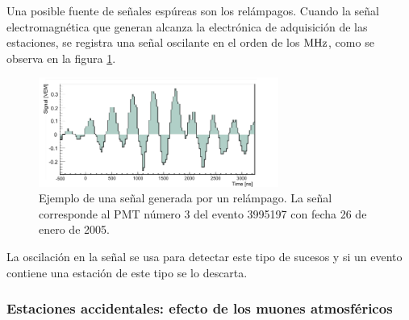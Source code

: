 		Una posible fuente de señales espúreas son los relámpagos.
		Cuando la señal electromagnética que generan alcanza la electrónica de adquisición de las estaciones, se registra una señal oscilante en el orden de los $\rm MHz$, como se observa en la figura \ref{fig:event1186354_st506_pmt3}.
		\begin{figure}[th!]
		\begin{center}
		\includegraphics[width=0.7\textwidth]{fig/seleccionAuger/event3995197_station506_pmt3.pdf}
		\caption{Ejemplo de una señal generada por un relámpago.
		La señal corresponde al PMT número 3 del evento 3995197 con fecha 26 de enero de 2005.}
		\label{fig:event1186354_st506_pmt3}
		\end{center}
		\end{figure}
		La oscilación en la señal se usa para detectar este tipo de sucesos y si un evento contiene una estación de este tipo se lo descarta.
		
		\subsubsection{Estaciones accidentales: efecto de los muones atmosféricos}
		
